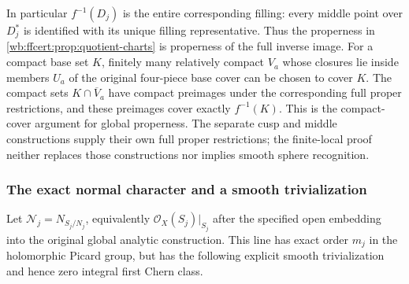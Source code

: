 In particular $f^{-1}(D_j)$ is the entire corresponding filling:
every middle point over $D_j^*$ is identified with its unique filling
representative. Thus the properness in
\cref{wb:ffcert:prop:quotient-charts} is properness of the full inverse
image. For a compact base set $K$, finitely many relatively compact
$V_a$ whose closures lie inside members $U_a$ of the original
four-piece base cover can be chosen to cover $K$. The compact sets
$K\cap\overline V_a$ have compact preimages under the corresponding
full proper restrictions, and these preimages cover exactly
$f^{-1}(K)$. This is the compact-cover argument for global properness.
The separate cusp and middle constructions supply their own full
proper restrictions; the finite-local proof neither replaces those
constructions nor implies smooth sphere recognition.

\subsubsection{The exact normal character and a smooth trivialization}

\begin{theorem}
\label{wb:ffcert:thm:normal-trivialization}
Let $\mathcal N_j=N_{S_j/N_j}$, equivalently
$\mathcal O_X(S_j)|_{S_j}$ after the specified open embedding into
the original global analytic construction. This line has exact order
$m_j$ in the holomorphic Picard group, but has the following explicit
smooth trivialization and hence zero integral first Chern class.
\end{theorem}

